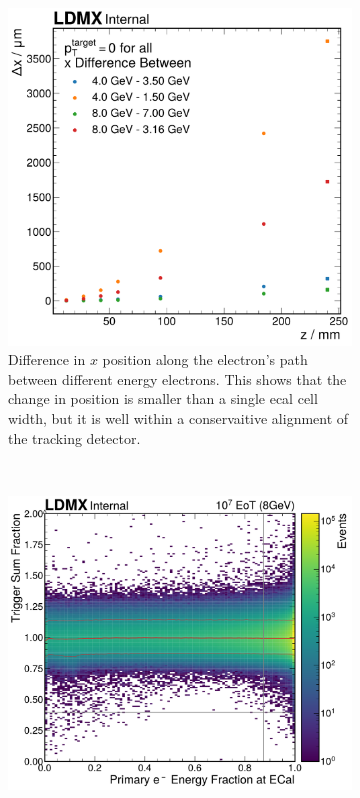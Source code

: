 \begin{figure}
  \centering
  \begin{subfigure}{0.48\textwidth}
    \centering
    \includegraphics[width=\textwidth]{figures/ldmx/analysis/x-res-in-fringe-field.pdf}
    \caption{Difference in $x$ position along the electron's path between
    different energy electrons. This shows that the change in position is smaller
    than a single \ac{ecal} cell width, but it is well within a conservaitive
    alignment of the tracking detector.}
  \end{subfigure}
  ~
  \begin{subfigure}{0.48\textwidth}
    \centering
    \includegraphics[width=\textwidth]{figures/ldmx/analysis/peff-by-trig-sum-with-profile-8gev.pdf}

\end{subfigure}
\end{figure}
